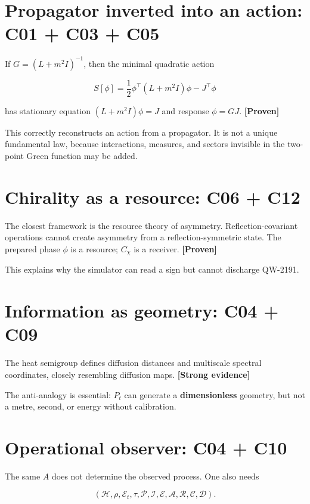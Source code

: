 \documentclass[11pt,a4paper,openany]{report}
\newcommand{\statusProven}{\textcolor{fingreen}{[Proven]}}
\newcommand{\statusStrong}{\textcolor{finblue}{[Strong evidence]}}
\begin{document}
\section{Propagator inverted into an action: C01 + C03 + C05}

If \(G=(L+m^2I)^{-1}\), then the minimal quadratic action

\[
S[\phi]=\frac12\phi^\top(L+m^2I)\phi-J^\top\phi
\]

has stationary equation \((L+m^2I)\phi=J\) and response \(\phi=GJ\). \textbf{\statusProven{}}

This correctly reconstructs an action from a propagator. It is not a unique fundamental law, because interactions, measures, and sectors invisible in the two-point Green function may be added.

\section{Chirality as a resource: C06 + C12}

The closest framework is the resource theory of asymmetry. Reflection-covariant operations cannot create asymmetry from a reflection-symmetric state. The prepared phase \(\phi\) is a resource; \(C_\chi\) is a receiver. \textbf{\statusProven{}}

This explains why the simulator can read a sign but cannot discharge QW-2191.

\section{Information as geometry: C04 + C09}

The heat semigroup defines diffusion distances and multiscale spectral coordinates, closely resembling diffusion maps. \textbf{\statusStrong{}}

The anti-analogy is essential: \(P_t\) can generate a \textbf{dimensionless} geometry, but not a metre, second, or energy without calibration.

\section{Operational observer: C04 + C10}

The same \(A\) does not determine the observed process. One also needs

\[
(\mathcal H,\rho,\mathcal E_t,\tau,\mathcal P,\mathcal I,\mathcal E,
\mathcal A,\mathcal R,\mathcal C,\mathcal D).
\]
\end{document}
